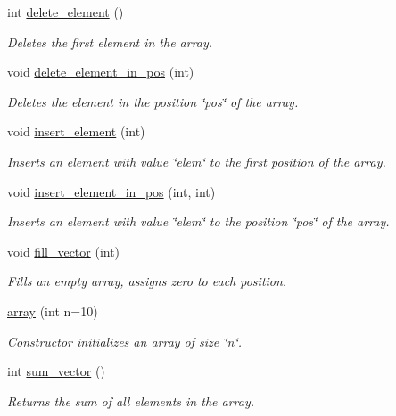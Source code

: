 \begin{DoxyCompactItemize}
\item 
int \hyperlink{classarray_a1264f89751d04076f0c9e40dd548b34a}{delete\-\_\-element} ()
\begin{DoxyCompactList}\small\item\em Deletes the first element in the array. \end{DoxyCompactList}\item 
void \hyperlink{classarray_a6866ed5e8568471e8fa5012214e8b31b}{delete\-\_\-element\-\_\-in\-\_\-pos} (int)
\begin{DoxyCompactList}\small\item\em Deletes the element in the position \char`\"{}pos\char`\"{} of the array. \end{DoxyCompactList}\item 
void \hyperlink{classarray_aeddcdc0e56dc8cea81f9031200722317}{insert\-\_\-element} (int)
\begin{DoxyCompactList}\small\item\em Inserts an element with value \char`\"{}elem\char`\"{} to the first position of the array. \end{DoxyCompactList}\item 
void \hyperlink{classarray_a3f88ff1af571a2a320e6ef79de2722fb}{insert\-\_\-element\-\_\-in\-\_\-pos} (int, int)
\begin{DoxyCompactList}\small\item\em Inserts an element with value \char`\"{}elem\char`\"{} to the position \char`\"{}pos\char`\"{} of the array. \end{DoxyCompactList}\item 
void \hyperlink{classarray_a1907d4f2b944c0acd6f45d4659e49646}{fill\-\_\-vector} (int)
\begin{DoxyCompactList}\small\item\em Fills an empty array, assigns zero to each position. \end{DoxyCompactList}\item 
\hyperlink{classarray_aedfc14adc0aaa8398258794564f79b22}{array} (int n=10)
\begin{DoxyCompactList}\small\item\em Constructor initializes an array of size \char`\"{}n\char`\"{}. \end{DoxyCompactList}\item 
int \hyperlink{classarray_adc0ddb6f7348edf390b97e883f4ee773}{sum\-\_\-vector} ()
\begin{DoxyCompactList}\small\item\em Returns the sum of all elements in the array. \end{DoxyCompactList}\item 

\end{DoxyCompactItemize}
